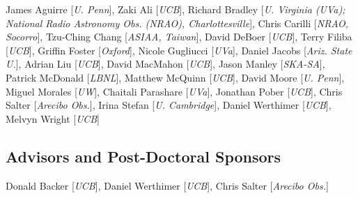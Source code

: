 \documentclass[apjpt4]{aastex}
\begin{document}
James Aguirre [{\it U. Penn}],
Zaki Ali [{\it UCB}],
Richard Bradley [{\it U. Virginia (UVa); National Radio Astronomy Obs. (NRAO), Charlottesville}],
Chris Carilli [{\it NRAO, Socorro}],
Tzu-Ching Chang [{\it ASIAA, Taiwan}],
David DeBoer [{\it UCB}],
Terry Filiba [{\it UCB}],
Griffin Foster [{\it Oxford}],
Nicole Gugliucci [{\it UVa}],
Daniel Jacobs [{\it Ariz. State U.}],
Adrian Liu [{\it UCB}],
David MacMahon [{\it UCB}],
Jason Manley [{\it SKA-SA}],
Patrick McDonald [{\it LBNL}],
Matthew McQuinn [{\it UCB}],
David Moore [{\it U. Penn}],
Miguel Morales [{\it UW}],
Chaitali Parashare [{\it UVa}],
Jonathan Pober [{\it UCB}],
Chris Salter [{\it Arecibo Obs.}],
Irina Stefan [{\it U. Cambridge}],
Daniel Werthimer [{\it UCB}],
Melvyn Wright [{\it UCB}]

\subsection*{Advisors and Post-Doctoral Sponsors}
\vspace{-8pt}

Donald Backer [{\it UCB}],
Daniel Werthimer [{\it UCB}],
Chris Salter [{\it Arecibo Obs.}]
\end{document}
